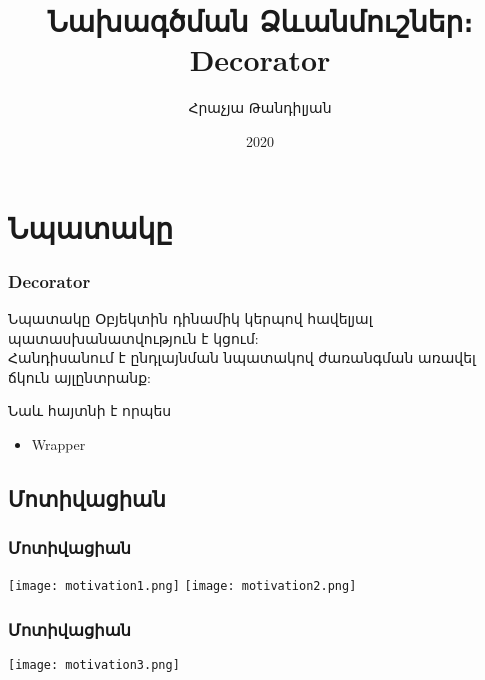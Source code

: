 \documentclass{beamer}
\begin{document}
\title[Decorator]{Նախագծման Ձևանմուշներ։ Decorator}
\author[Հրաչյա Թանդիլյան\copyright]{Հրաչյա Թանդիլյան}
\date{2020}

\begin{frame}
\titlepage
\end{frame}

\section{Նպատակը}
\begin{frame}\frametitle{Decorator}
\begin{block}{Նպատակը}
    Օբյեկտին դինամիկ կերպով հավելյալ պատասխանատվություն է կցում: \\ Հանդիսանում է
    ընդլայնման նպատակով ժառանգման առավել ճկուն այլընտրանք:
\end{block}
\vfill
Նաև հայտնի է որպես
\begin{itemize}
    \item Wrapper
\end{itemize}
\end{frame}

\subsection{Մոտիվացիան}
\begin{frame}\frametitle{Մոտիվացիան}
\begin{center}
    \texttt{[image: motivation1.png]}
    \texttt{[image: motivation2.png]}
\end{center}
\end{frame}

\begin{frame}\frametitle{Մոտիվացիան}
\begin{center}
    \texttt{[image: motivation3.png]}
\end{center}
\end{frame}
\end{document}
